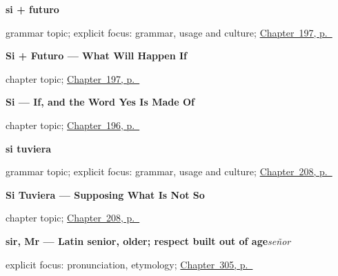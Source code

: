 \noindent\begin{minipage}[t]{\linewidth}
\raggedright
\textbf{si + futuro}\par
\footnotesize grammar topic; explicit focus: grammar, usage and culture; \hyperref[ch:si-futuro]{Chapter~197, p.~\pageref*{ch:si-futuro}}
\end{minipage}\par\smallskip

\noindent\begin{minipage}[t]{\linewidth}
\raggedright
\textbf{Si + Futuro --- What Will Happen If}\par
\footnotesize chapter topic; \hyperref[ch:si-futuro]{Chapter~197, p.~\pageref*{ch:si-futuro}}
\end{minipage}\par\smallskip

\noindent\begin{minipage}[t]{\linewidth}
\raggedright
\textbf{Si --- If, and the Word Yes Is Made Of}\par
\footnotesize chapter topic; \hyperref[ch:si]{Chapter~196, p.~\pageref*{ch:si}}
\end{minipage}\par\smallskip

\noindent\begin{minipage}[t]{\linewidth}
\raggedright
\textbf{si tuviera}\par
\footnotesize grammar topic; explicit focus: grammar, usage and culture; \hyperref[ch:si-tuviera]{Chapter~208, p.~\pageref*{ch:si-tuviera}}
\end{minipage}\par\smallskip

\noindent\begin{minipage}[t]{\linewidth}
\raggedright
\textbf{Si Tuviera --- Supposing What Is Not So}\par
\footnotesize chapter topic; \hyperref[ch:si-tuviera]{Chapter~208, p.~\pageref*{ch:si-tuviera}}
\end{minipage}\par\smallskip

\noindent\begin{minipage}[t]{\linewidth}
\raggedright
\textbf{sir, Mr — Latin senior, older; respect built out of age}\enspace\emph{señor}\par
\footnotesize explicit focus: pronunciation, etymology; \hyperref[ch:nombre-y-apellido]{Chapter~305, p.~\pageref*{ch:nombre-y-apellido}}
\end{minipage}\par\smallskip

